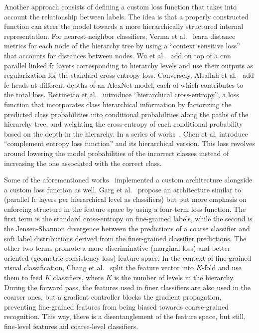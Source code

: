 Another approach consists of defining a custom loss function that takes into account the relationship between labels. The idea is that a properly constructed function can steer the model towards a more hierarchically structured internal representation.
For nearest-neighbor classifiers, Verma et al.~\cite{LearningHierarVerma2012} learn distance metrics for each node of the hierarchy tree by using a ``context sensitive loss'' that accounts for distances between nodes.
Wu et al.~\cite{LearningToMakWuHu2016} add on top of a \acrshort{cnn} parallel linked \acrshort{fc} layers corresponding to hierarchy levels and use their outputs as regularization for the standard cross-entropy loss.
Conversely, Alsallah et al.~\cite{DoConvolutionaAlsall2017} add \acrshort{fc} heads at different depths of an AlexNet model, each of which
contributes to the total loss.
Bertinetto et al.~\cite{MakingBetterMBertin2019} introduce ``hierarchical cross-entropy'', a loss function that incorporates class hierarchical information by factorizing the predicted class probabilities into conditional probabilities along the paths of the hierarchy tree, and weighting the cross-entropy of each conditional probability based on the depth in the hierarchy.
In a series of works~\cite{ComplementObjeChen2019, ImprovingAdverChen2019, LearningWithHChen2019}, Chen et al. introduce ``complement entropy loss function'' and its hierarchical version. This loss revolves around lowering the model probabilities of the incorrect classes instead of increasing the one associated with the correct class.

Some of the aforementioned works~\cite{LearningToMakWuHu2016, DoConvolutionaAlsall2017} implemented a custom architecture alongside a custom loss function as well. 
Garg et al.~\cite{LearningHierarGarg2022} propose an architecture similar to~\cite{LearningToMakWuHu2016} (parallel \acrshort{fc} layers per hierarchical level as classifiers) but put more emphasis on enforcing structure in the feature space by using a four-term loss function. The first term is the standard cross-entropy on fine-grained labels, while the second is the Jensen-Shannon divergence between the predictions of a coarse classifier and soft label distributions derived from the finer-grained classifier predictions. The other two terms promote a more discriminative (marginal loss) and better oriented (geometric consistency loss) feature space.
In the context of fine-grained visual classification, Chang et al.~\cite{YourFlamingoChang2020} split the feature vector into $K$-fold and use them to feed $K$ classifiers, where $K$ is the number of levels in the hierarchy. During the forward pass, the features used in finer classifiers are also used in the coarser ones, but a gradient controller blocks the gradient propagation, preventing fine-grained features from being biased towards coarse-grained recognition. This way, there is a disentanglement of the feature space, but still, fine-level features aid coarse-level classifiers.

